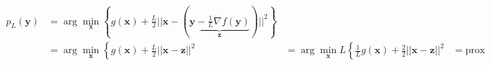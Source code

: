 \documentclass[preview,border=0.3pt]{standalone}
\begin{document}
%
\begin{align*}
p_L(\mathbf{y}) &= \arg\min_\mathbf{x}\left\{ g(\mathbf{x}) + \frac{L}{2}||\mathbf{x} - \left( \underbrace{\mathbf{y} - \frac{1}{L} \nabla f(\mathbf{y})}_{\mathbf{z}} \right)||^2 \right\}\\
%
&=\arg\min_\mathbf{x}\left\{ g(\mathbf{x}) + \frac{L}{2}||\mathbf{x} - \mathbf{z}||^2
&=\arg\min_\mathbf{x}L\left\{ \frac{1}{L}g(\mathbf{x}) + \frac{2}{2}||\mathbf{x} - \mathbf{z}||^2
&= \mathrm{prox}_{}
\end{align*}
\end{document}
